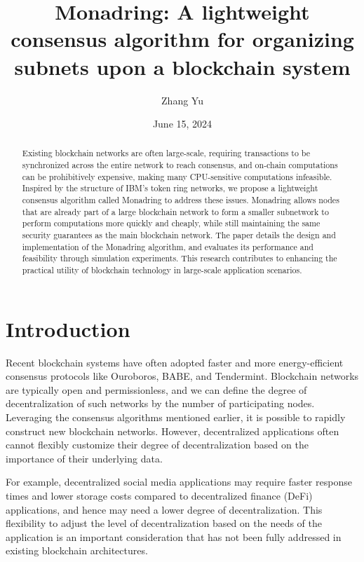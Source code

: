 \documentclass[11pt]{article}
\begin{document}
\title{Monadring: A lightweight consensus algorithm for organizing subnets upon a blockchain system}
\author{Zhang Yu}
\date{June 15, 2024}
\maketitle

\begin{abstract}
Existing blockchain networks are often large-scale, requiring transactions to be synchronized across the entire network to reach consensus, and on-chain computations can be prohibitively expensive, making many CPU-sensitive computations infeasible. Inspired by the structure of IBM's token ring networks, we propose a lightweight consensus algorithm called Monadring to address these issues. Monadring allows nodes that are already part of a large blockchain network to form a smaller subnetwork to perform computations more quickly and cheaply, while still maintaining the same security guarantees as the main blockchain network. The paper details the design and implementation of the Monadring algorithm, and evaluates its performance and feasibility through simulation experiments. This research contributes to enhancing the practical utility of blockchain technology in large-scale application scenarios.
\end{abstract}

\section{Introduction}

Recent blockchain systems have often adopted faster and more energy-efficient consensus protocols like Ouroboros, BABE, and Tendermint. Blockchain networks are typically open and permissionless, and we can define the degree of decentralization of such networks by the number of participating nodes. Leveraging the consensus algorithms mentioned earlier, it is possible to rapidly construct new blockchain networks. However, decentralized applications often cannot flexibly customize their degree of decentralization based on the importance of their underlying data.

For example, decentralized social media applications may require faster response times and lower storage costs compared to decentralized finance (DeFi) applications, and hence may need a lower degree of decentralization. This flexibility to adjust the level of decentralization based on the needs of the application is an important consideration that has not been fully addressed in existing blockchain architectures.
\end{document}
